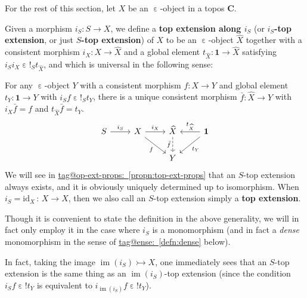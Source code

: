 \documentclass{amsart}
\makeatletter
\newcommand\bC{\mathbf{C}}
\newcommand\defword[1]{{\boldmath \textbf{#1}}}
\newcommand\ein{\mathrel{\varepsilon}}
\newcommand\id{\mathrm{id}}
\newcommand\im{\operatorname{im}}
\newcommand\tm{\mathbf{1}}
\newcommand\tolon{{\,:\,}}
\newcommand\tto{\rightarrowtail}
\newcommand\unein{{\ein}}
\newcommand\unex{{!}}
\newcommand\wh[1]{\widehat{#1}}
\newcommand\tagword[1]{\csname tag@#1\endcsname}
\def\label@tag#1:#2\@nil{#1}
\newcommand\labeltag[1]{\label@tag#1:\@nil}
\newcommand\jref[1]{%
  \texorpdfstring%
    {\hyperref[#1]{\tagword{\labeltag{#1}}~\ref*{#1}}}%
    {\tagword{\labeltag{#1}}~\ref*{#1}}%
}
\theoremstyle{definition}
\theoremstyle{remark}
\theoremstyle{plainwithref}
\makeatother
\begin{document}
For the rest of this section, let \( X \) be an \( \unein \)-object in a topos \( \bC \).
\begin{defn} \label{defn:top-extension}
  Given a morphism \( i_S \colon S \to X \), we define a \defword{top extension along \( i_S \)} (or \defword{\( i_S \)-top extension}, or just \defword{\( S \)-top extension}) of \( X \) to be an \( \unein \)-object \( \wh X \) together with a consistent morphism \( i_X \colon X \to \wh X \) and a global element \( t_{\wh X} \colon \tm \to \wh X \) satisfying \( i_S i_X \ein \unex_S t_{\wh X} \), and which is universal in the following sense:

  For any \( \unein \)-object \( Y \) with a consistent morphism \( f \colon X \to Y \) and global element \( t_Y \colon \tm \to Y \) with \( i_S f \ein \unex_S t_Y \), there is a unique consistent morphism \( \bar f \colon \wh X \to Y \) with \( i_X \bar f = f \) and \( t_{\wh X} \bar f = t_Y \).
  \[
    \begin{tikzcd}
      S \ar[r, "i_S"] & X \ar[r, "i_X"] \ar[rd, "f"'] & \wh X \ar[d, "\bar f"', dashed] & \tm \ar[l, "t_{\wh X}"'] \ar[ld, "t_Y"] \\
      & & Y
    \end{tikzcd}
  \]
  We will see in \jref{propn:top-ext-props} that an \( S \)-top extension always exists, and it is obviously uniquely determined up to isomorphism.
  When \( i_S = \id_X \tolon X \to X \), then we also call an \( S \)-top extension simply a \defword{top extension}.
\end{defn}

\begin{rmk}
  Though it is convenient to state the definition in the above generality, we will in fact only employ it in the case where \( i_S \) is a monomorphism (and in fact a \emph{dense} monomorphism in the sense of \jref{defn:dense} below).

  In fact, taking the image \( \im(i_S) \tto X \), one immediately sees that an \( S \)-top extension is the same thing as an \( \im(i_S) \)-top extension (since the condition \( i_S f \ein \unex t_Y \) is equivalent to \( i_{\im(i_S)} f \ein \unex t_Y \)).
\end{rmk}
\end{document}
